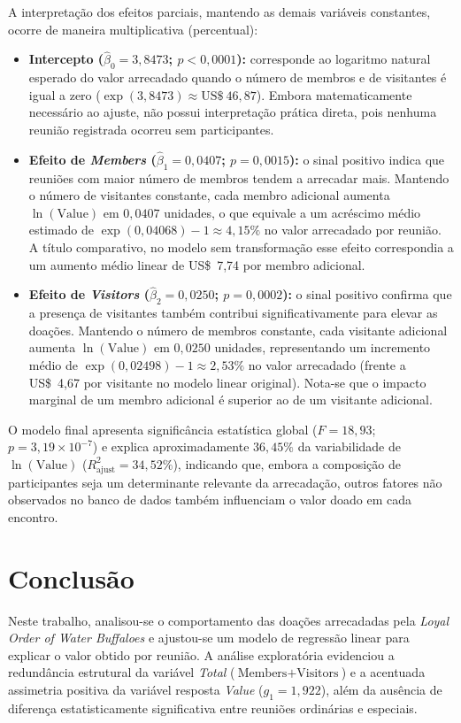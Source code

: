 \documentclass[11pt,a4paper]{article}
\begin{document}
A interpretação dos efeitos parciais, mantendo as demais variáveis constantes, ocorre de maneira multiplicativa (percentual):
\begin{itemize}
    \item \textbf{Intercepto ($\hat{\beta}_0 = 3{,}8473$; $p < 0{,}0001$):} corresponde ao logaritmo natural esperado do valor arrecadado quando o número de membros e de visitantes é igual a zero ($\exp(3{,}8473) \approx \text{US\$}~46{,}87$). Embora matematicamente necessário ao ajuste, não possui interpretação prática direta, pois nenhuma reunião registrada ocorreu sem participantes.
    \item \textbf{Efeito de \textit{Members} ($\hat{\beta}_1 = 0{,}0407$; $p = 0{,}0015$):} o sinal positivo indica que reuniões com maior número de membros tendem a arrecadar mais. Mantendo o número de visitantes constante, cada membro adicional aumenta $\ln(\text{Value})$ em $0{,}0407$ unidades, o que equivale a um acréscimo médio estimado de $\exp(0{,}04068) - 1 \approx 4{,}15\%$ no valor arrecadado por reunião. A título comparativo, no modelo sem transformação esse efeito correspondia a um aumento médio linear de US\$~7,74 por membro adicional.
    \item \textbf{Efeito de \textit{Visitors} ($\hat{\beta}_2 = 0{,}0250$; $p = 0{,}0002$):} o sinal positivo confirma que a presença de visitantes também contribui significativamente para elevar as doações. Mantendo o número de membros constante, cada visitante adicional aumenta $\ln(\text{Value})$ em $0{,}0250$ unidades, representando um incremento médio de $\exp(0{,}02498) - 1 \approx 2{,}53\%$ no valor arrecadado (frente a US\$~4,67 por visitante no modelo linear original). Nota-se que o impacto marginal de um membro adicional é superior ao de um visitante adicional.
\end{itemize}

O modelo final apresenta significância estatística global ($F = 18{,}93$; $p = 3{,}19 \times 10^{-7}$) e explica aproximadamente $36{,}45\%$ da variabilidade de $\ln(\text{Value})$ ($R^2_{\text{ajust}} = 34{,}52\%$), indicando que, embora a composição de participantes seja um determinante relevante da arrecadação, outros fatores não observados no banco de dados também influenciam o valor doado em cada encontro.

\section{Conclusão}

Neste trabalho, analisou-se o comportamento das doações arrecadadas pela \textit{Loyal Order of Water Buffaloes} e ajustou-se um modelo de regressão linear para explicar o valor obtido por reunião. A análise exploratória evidenciou a redundância estrutural da variável \textit{Total} ($\text{Members} + \text{Visitors}$) e a acentuada assimetria positiva da variável resposta \textit{Value} ($g_1 = 1{,}922$), além da ausência de diferença estatisticamente significativa entre reuniões ordinárias e especiais.
\end{document}
